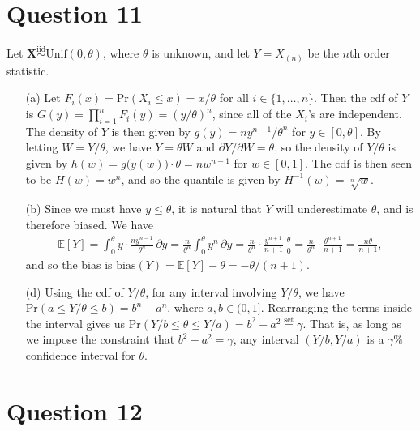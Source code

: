 \documentclass[10pt]{article}
\begin{document}
\section{Question 11} \noindent
Let \(\bm{X} \overset{\mathrm{iid}}{\sim} \mathrm{Unif}(0, \theta)\), where \(\theta\) is unknown, and let \(Y = X_{(n)}\) be the \(n\)th order statistic. 
\begin{itemize}
    \item[(a)] Let \(F_i(x) = \mathrm{Pr}(X_i \le x) = x / \theta\) for all \(i \in \{1, \ldots, n\}\). Then the cdf of \(Y\) is 
    \(G(y) = \prod_{i = 1}^n F_i(y) = \left( y / \theta \right)^n\), since all of the \(X_i\)'s are independent. The density of \(Y\) is then given by 
    \(g(y) = n y^{n - 1} / \theta^n\) for \(y \in [0, \theta]\). By letting \(W = Y / \theta\), we have \(Y = \theta W\) and \(\partial Y / \partial W = \theta\), 
    so the density of \(Y / \theta\) is given by \(h(w) = g\big( y(w) \big) \cdot \theta = n w^{n-1}\) for \(w \in [0,1]\). The cdf is then seen to be 
    \(H(w) = w^n\), and so the quantile is given by \(H^{-1}(w) = \sqrt[n]{w}\).
    \item[(b)] Since we must have \(y \le \theta\), it is natural that \(Y\) will underestimate \(\theta\), and is therefore biased. We have 
    \begin{align*}
        \mathbb{E}[Y]
        = \int_{0}^{\theta} y \cdot \frac{n y^{n-1}}{\theta^n} \,\partial y
        = \frac{n}{\theta^n} \int_0^{\theta} y^n \,\partial y
        = \frac{n}{\theta^n} \cdot \frac{y^{n+1}}{n+1} \bigg|_{0}^{\theta}
        = \frac{n}{\theta^n} \cdot \frac{\theta^{n+1}}{n+1}
        = \frac{n\theta}{n+1},
    \end{align*}
    and so the bias is \(\mathrm{bias}(Y) = \mathbb{E}[Y] - \theta = -\theta / (n+1)\). 
    \item[(d)] Using the cdf of \(Y / \theta\), for any interval involving \(Y / \theta\), we have \(\mathrm{Pr}(a \le Y / \theta \le b) = b^n - a^n\), where 
    \(a, b \in (0, 1]\). Rearranging the terms inside the interval gives us \(\mathrm{Pr}(Y / b \le \theta \le Y / a) = b^2 - a^2 \overset{\mathrm{set}}{=} \gamma\).
    That is, as long as we impose the constraint that \(b^2 - a^2 = \gamma\), any interval \((Y/b, Y/a)\) is a \(\gamma\)\%{} confidence interval for \(\theta\). 
\end{itemize}

\section{Question 12} \noindent
\end{document}
